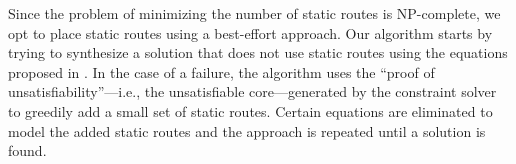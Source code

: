 Since the problem of minimizing the number of static routes
is NP-complete, we opt to place static routes using a best-effort approach.
Our algorithm starts by trying to synthesize a solution
that does not use static routes using the equations 
proposed in . 
In the case of a failure, the algorithm uses the ``proof of unsatisfiability''---i.e., the unsatisfiable core---generated by 
the constraint solver 
to greedily add a small set of static routes. 
Certain equations are eliminated 
to model the added static routes 
and the approach is repeated until a solution is found.

